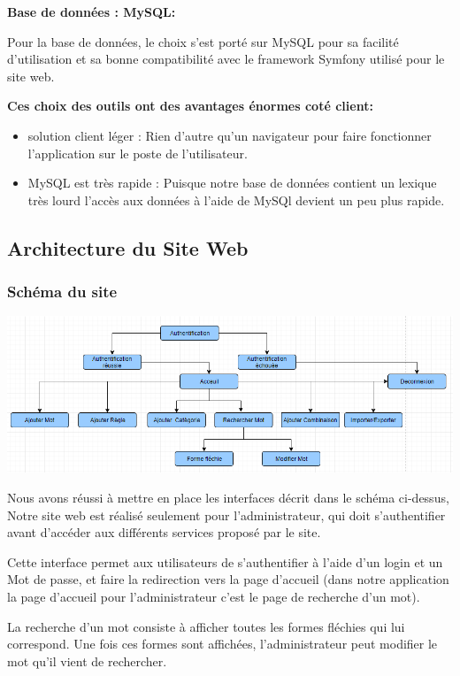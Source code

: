 \documentclass[12pt,a4paper]{article}
\begin{document}
\smallbreak

\textbf{Base de données : MySQL:}


Pour la base de données, le choix s'est porté sur MySQL pour sa facilité d'utilisation et sa bonne compatibilité avec le framework Symfony utilisé pour le site web. 


\textbf{Ces choix des outils ont des avantages énormes coté client:}

\begin{itemize}  
  \item solution client léger : Rien d'autre qu'un navigateur pour faire fonctionner l'application sur le poste de l'utilisateur.
  \item MySQL est très rapide : Puisque notre base de données contient un lexique très lourd l'accès aux données à l'aide de MySQl devient un peu plus rapide.
\end{itemize}

\subsection{ Architecture du Site Web }
\subsubsection{Schéma du site} 

\includegraphics[width=150mm]{img/site.PNG}

Nous avons réussi à mettre en place les interfaces décrit dans le schéma ci-dessus,
Notre site web est réalisé seulement pour l'administrateur, qui doit s'authentifier
avant d'accéder aux différents services proposé par le site.

Cette interface permet aux utilisateurs de s'authentifier à l’aide d'un login et un Mot de passe, 
et faire la redirection vers la page d'accueil (dans notre application la page d'accueil
pour l'administrateur c'est le page de recherche d'un mot).

La recherche d'un mot consiste à afficher toutes les formes fléchies qui lui correspond. Une fois ces formes sont affichées, 
l'administrateur peut modifier le mot qu'il vient de rechercher.
\end{document}
